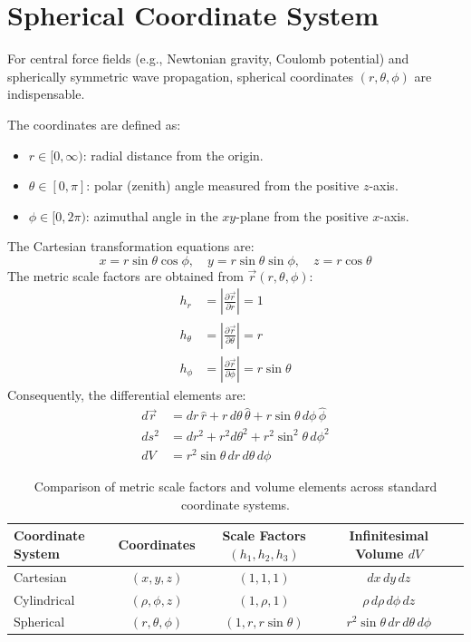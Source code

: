 \section{Spherical Coordinate System}
For central force fields (e.g., Newtonian gravity, Coulomb potential) and spherically symmetric wave propagation, spherical coordinates $(r, \theta, \phi)$ are indispensable.

The coordinates are defined as:
\begin{itemize}
    \item $r \in [0, \infty)$: radial distance from the origin.
    \item $\theta \in [0, \pi]$: polar (zenith) angle measured from the positive $z$-axis.
    \item $\phi \in [0, 2\pi)$: azimuthal angle in the $xy$-plane from the positive $x$-axis.
\end{itemize}
The Cartesian transformation equations are:
\begin{equation}
x = r\sin\theta\cos\phi, \quad y = r\sin\theta\sin\phi, \quad z = r\cos\theta
\end{equation}
The metric scale factors are obtained from $\vec{r}(r, \theta, \phi)$:
\begin{align}
h_r &= \left|\frac{\partial \vec{r}}{\partial r}\right| = 1 \\
h_\theta &= \left|\frac{\partial \vec{r}}{\partial \theta}\right| = r \\
h_\phi &= \left|\frac{\partial \vec{r}}{\partial \phi}\right| = r\sin\theta
\end{align}
Consequently, the differential elements are:
\begin{align}
d\vec{r} &= dr\,\hat{r} + r\,d\theta\,\hat{\theta} + r\sin\theta\,d\phi\,\hat{\phi} \\
ds^2 &= dr^2 + r^2 d\theta^2 + r^2\sin^2\theta\,d\phi^2 \\
dV &= r^2\sin\theta\,dr\,d\theta\,d\phi
\end{align}

\begin{table}[H]
\centering
\small
\begin{tabularx}{\textwidth}{lcccc}
\toprule
\textbf{Coordinate System} & \textbf{Coordinates} & \textbf{Scale Factors} $(h_1, h_2, h_3)$ & \textbf{Infinitesimal Volume} $dV$ \\
\midrule
Cartesian & $(x, y, z)$ & $(1, 1, 1)$ & $dx\,dy\,dz$ \\
Cylindrical & $(\rho, \phi, z)$ & $(1, \rho, 1)$ & $\rho\,d\rho\,d\phi\,dz$ \\
Spherical & $(r, \theta, \phi)$ & $(1, r, r\sin\theta)$ & $r^2\sin\theta\,dr\,d\theta\,d\phi$ \\
\bottomrule
\end{tabularx}
\caption{Comparison of metric scale factors and volume elements across standard coordinate systems.}
\label{tab:ch01_scale_factors}
\end{table}

